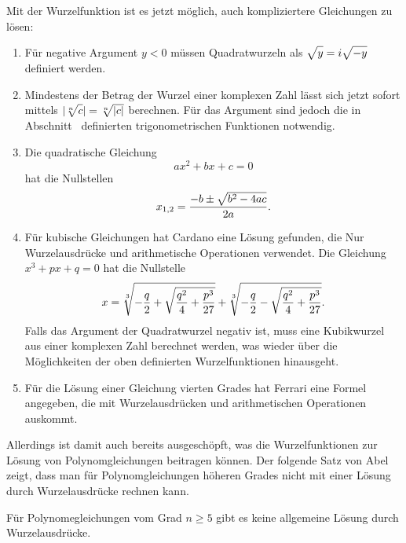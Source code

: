 Mit der Wurzelfunktion ist es jetzt möglich, auch kompliziertere
Gleichungen zu lösen:
\begin{enumerate}
\item
Für negative Argument $y<0$ müssen Quadratwurzeln als
$\sqrt{y\mathstrut}=i\sqrt{-y\mathstrut}$ definiert werden.
\item
Mindestens der Betrag der Wurzel einer komplexen Zahl lässt
sich jetzt sofort mittels $|\root{n}\of{c\mathstrut}|=\root{n}\of{|c|\mathstrut}$
berechnen.
Für das Argument sind jedoch die in
Abschnitt~\label{buch:geometrie:section:trigonometrisch} definierten
trigonometrischen Funktionen notwendig.
\item
Die quadratische Gleichung 
\[
ax^2+bx+c=0
\]
hat die Nullstellen
\[
x_{1,2} = \frac{-b\pm\sqrt{b^2-4ac\mathstrut}}{2a}.
\]
\item
Für kubische Gleichungen hat Cardano eine Lösung gefunden, die
Nur Wurzelausdrücke und arithmetische Operationen verwendet.
Die Gleichung $x^3+px+q=0$ hat die Nullstelle
\[
x
=
\root{3}\of{-\frac{q}2+\sqrt{\frac{q^2}4+\frac{p^3}{27}}}
+
\root{3}\of{-\frac{q}2-\sqrt{\frac{q^2}4+\frac{p^3}{27}}}.
\]
Falls das Argument der Quadratwurzel negativ ist, muss eine
Kubikwurzel aus einer komplexen Zahl berechnet werden, was
wieder über die Möglichkeiten der oben definierten Wurzelfunktionen
hinausgeht.
\item
Für die Lösung einer Gleichung vierten Grades hat Ferrari eine
Formel angegeben, die mit Wurzelausdrücken und arithmetischen
Operationen auskommt.
\end{enumerate}

Allerdings ist damit auch bereits ausgeschöpft, was die
Wurzelfunktionen zur Lösung von Polynomgleichungen beitragen
können.
Der folgende Satz von Abel zeigt, dass man für Polynomgleichungen
höheren Grades nicht mit einer Lösung durch Wurzelausdrücke
rechnen kann.

\begin{satz}[Abel]
Für Polynomegleichungen vom Grad $n\ge 5$ gibt es keine allgemeine
Lösung durch Wurzelausdrücke.
\end{satz}

